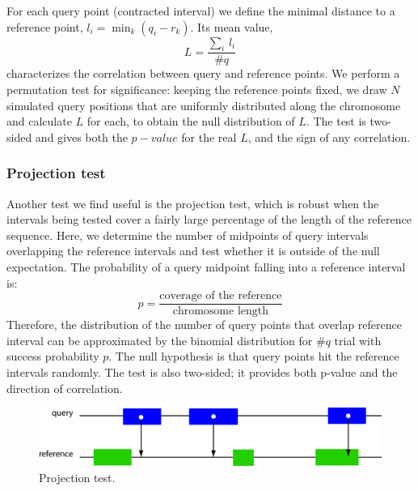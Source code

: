 \documentclass{article}
\begin{document}
For each query point (contracted interval) we define the minimal distance to a reference point, $l_i=\min_k(q_i-r_k)$. Its mean value,
\[L=\displaystyle\frac{\displaystyle\sum_i\,l_i}{\#q}\] characterizes the correlation between query and reference points. We perform a permutation test for significance: keeping the reference points fixed, we draw $N$ simulated query positions that are uniformly distributed along the chromosome and calculate $L$ for each, to obtain the null distribution of $L$. The test is two-sided and gives both the $p-value$ for the real $L$, and the sign of any correlation.

\subsubsection{Projection test}

Another test we find useful is the projection test, which is robust when the intervals being tested cover a fairly large percentage of the length of the reference sequence. Here, we determine the number of midpoints of query intervals overlapping the reference intervals and test whether it is outside of the null expectation. The probability of a query midpoint falling into a reference interval is: 
\[p=\displaystyle\frac{\mbox{coverage of the reference}}{\mbox{chromosome length}}\] Therefore, the distribution of the number of query points that overlap reference interval can be approximated by the binomial distribution for $\#q$ trial with success probability $p$. The null hypothesis is that query points hit the reference intervals randomly. The test is also two-sided; it provides both p-value and the direction of correlation.    

\begin{figure}[h!]
	\centering\includegraphics[scale=\picscale]{png/fig9}
	\caption{Projection test.}
\end{figure}
\end{document}
